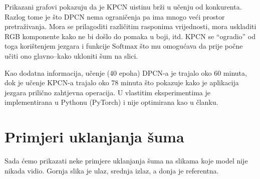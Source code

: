 \documentclass[times, utf8, seminar, numeric]{fer}
\begin{document}
Prikazani grafovi pokazuju da je KPCN uistinu brži u učenju od konkurenta. Razlog tome je što DPCN
nema ograničenja pa ima mnogo veći prostor pretraživanja. Mora se prilagoditi različitim
rasponima vrijednosti, mora uskladiti RGB komponente kako ne bi došlo do pomaka u boji, itd.
KPCN se ``ogradio'' od toga korištenjem jezgara i funkcije $\mathrm{Softmax}$ što mu omogućava
da prije počne učiti ono glavno--kako ukloniti šum na slici.

Kao dodatna informacija, učenje (40 epoha) DPCN-a je trajalo oko 60 minuta, dok je učenje KPCN-a
trajalo oko 78 minuta što pokazuje kako je aplikacija jezgara prilično zahtjevna operacija.
U vlastitim eksperimentima je implementirana u Pythonu (PyTorch) i nije optimirana kao u
članku.

\section{Primjeri uklanjanja šuma}
Sada ćemo prikazati neke primjere uklanjanja šuma na slikama koje model nije nikada vidio.
Gornja slika je ulaz, srednja izlaz, a donja je referentna.
\end{document}
